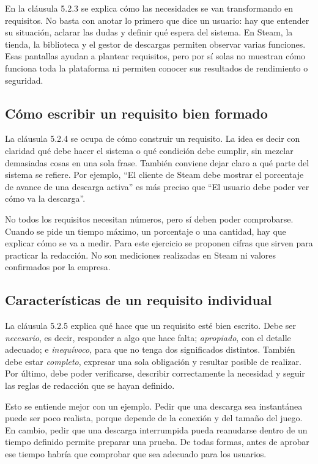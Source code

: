 \documentclass[12pt,a4paper]{article}
\begin{document}
En la cláusula 5.2.3 se explica cómo las necesidades se van transformando en requisitos. No basta con anotar lo primero que dice un usuario: hay que entender su situación, aclarar las dudas y definir qué espera del sistema. En Steam, la tienda, la biblioteca y el gestor de descargas permiten observar varias funciones. Esas pantallas ayudan a plantear requisitos, pero por sí solas no muestran cómo funciona toda la plataforma ni permiten conocer sus resultados de rendimiento o seguridad.

\subsection*{Cómo escribir un requisito bien formado}

La cláusula 5.2.4 se ocupa de cómo construir un requisito. La idea es decir con claridad qué debe hacer el sistema o qué condición debe cumplir, sin mezclar demasiadas cosas en una sola frase. También conviene dejar claro a qué parte del sistema se refiere. Por ejemplo, ``El cliente de Steam debe mostrar el porcentaje de avance de una descarga activa'' es más preciso que ``El usuario debe poder ver cómo va la descarga''.

No todos los requisitos necesitan números, pero sí deben poder comprobarse. Cuando se pide un tiempo máximo, un porcentaje o una cantidad, hay que explicar cómo se va a medir. Para este ejercicio se proponen cifras que sirven para practicar la redacción. No son mediciones realizadas en Steam ni valores confirmados por la empresa.

\subsection*{Características de un requisito individual}

La cláusula 5.2.5 explica qué hace que un requisito esté bien escrito. Debe ser \emph{necesario}, es decir, responder a algo que hace falta; \emph{apropiado}, con el detalle adecuado; e \emph{inequívoco}, para que no tenga dos significados distintos. También debe estar \emph{completo}, expresar una sola obligación y resultar posible de realizar. Por último, debe poder verificarse, describir correctamente la necesidad y seguir las reglas de redacción que se hayan definido.

Esto se entiende mejor con un ejemplo. Pedir que una descarga sea instantánea puede ser poco realista, porque depende de la conexión y del tamaño del juego. En cambio, pedir que una descarga interrumpida pueda reanudarse dentro de un tiempo definido permite preparar una prueba. De todas formas, antes de aprobar ese tiempo habría que comprobar que sea adecuado para los usuarios.
\end{document}
